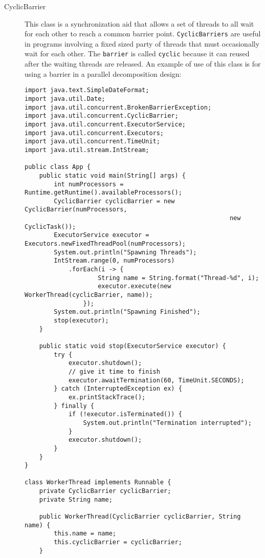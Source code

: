 \documentclass{latex/classes/myarticle}
\begin{document}
\begin{description}
\item[{CyclicBarrier}] This class is a synchronization aid that allows a set of
threads to all wait for each other to reach a common barrier
point. \texttt{CyclicBarriers} are useful in programs involving a fixed sized party
of threads that must occasionally wait for each other. The \texttt{barrier} is
called \texttt{cyclic} because it can reused after the waiting threads are
released. An example of use of this class is for using a barrier in a
parallel decomposition design:

\begin{lstlisting}
import java.text.SimpleDateFormat;
import java.util.Date;
import java.util.concurrent.BrokenBarrierException;
import java.util.concurrent.CyclicBarrier;
import java.util.concurrent.ExecutorService;
import java.util.concurrent.Executors;
import java.util.concurrent.TimeUnit;
import java.util.stream.IntStream;

public class App {
    public static void main(String[] args) {
        int numProcessors = Runtime.getRuntime().availableProcessors();
        CyclicBarrier cyclicBarrier = new CyclicBarrier(numProcessors,
                                                        new CyclicTask());
        ExecutorService executor = Executors.newFixedThreadPool(numProcessors);
        System.out.println("Spawning Threads");
        IntStream.range(0, numProcessors)
            .forEach(i -> {
                    String name = String.format("Thread-%d", i);
                    executor.execute(new WorkerThread(cyclicBarrier, name));
                });
        System.out.println("Spawning Finished");
        stop(executor);
    }

    public static void stop(ExecutorService executor) {
        try {
            executor.shutdown();
            // give it time to finish
            executor.awaitTermination(60, TimeUnit.SECONDS);
        } catch (InterruptedException ex) {
            ex.printStackTrace();
        } finally {
            if (!executor.isTerminated()) {
                System.out.println("Termination interrupted");
            }
            executor.shutdown();
        }
    }
}

class WorkerThread implements Runnable {
    private CyclicBarrier cyclicBarrier;
    private String name;

    public WorkerThread(CyclicBarrier cyclicBarrier, String name) {
        this.name = name;
        this.cyclicBarrier = cyclicBarrier;
    }


\end{lstlisting}
\end{description}
\end{document}
